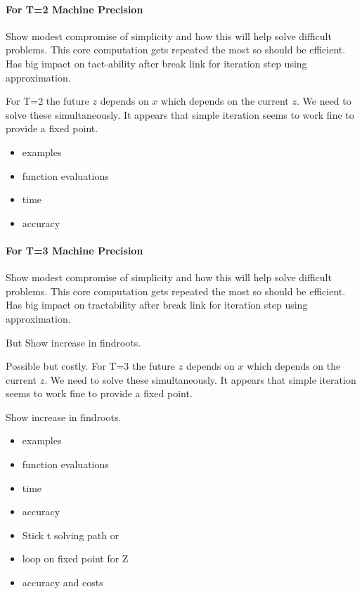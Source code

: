 \documentclass[12pt]{article}
\begin{document}
\paragraph{For T=2  Machine Precision}
\label{sec:t=1}

Show modest compromise  of 
simplicity and how this will help solve difficult problems.  
This core computation gets repeated the most so should be efficient. Has big
impact on tact-ability after break link for iteration step using approximation.


For T=2 the future $z$ depends on $x$ which depends on the current $z$.
We need to solve these simultaneously. 
It appears that simple iteration seems to work fine to provide a fixed point.  


\begin{itemize}
\item examples
\item function evaluations
\item time
\item accuracy
\end{itemize}



\paragraph{For T=3  Machine Precision}
\label{sec:t=1}


Show modest compromise  of 
simplicity and how this will help solve difficult problems.  
This core computation gets repeated the most so should be efficient. Has big
impact on tractability after break link for iteration step using approximation.

But Show increase in findroots.

Possible but costly.
For T=3 the future $z$ depends on $x$ which depends on the current $z$.
We need to solve these simultaneously. 
It appears that simple iteration seems to work fine to provide a fixed point.  

Show increase in findroots.


\begin{itemize}
\item examples
\item function evaluations
\item time
\item accuracy
\end{itemize}

\begin{itemize}
\item Stick t solving path or
\item loop on fixed point for Z
\item accuracy and costs
\end{itemize}
\end{document}
